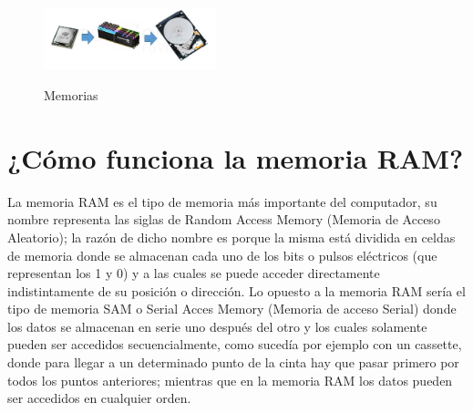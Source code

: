\documentclass{article}
\begin{document}
 
\begin{figure}[h]
\includegraphics[width=5cm]{memorias.jpg}
 \cite{Red}
\centering
\caption{Memorias}
\label{fig:c}
\end{figure}

\section{¿Cómo funciona la memoria RAM?}\label{contenido} 
La memoria RAM es el tipo de memoria más importante del computador, su nombre representa
las siglas de Random Access Memory (Memoria de Acceso Aleatorio); la razón de dicho nombre
es porque la misma está dividida en celdas de memoria donde se almacenan cada uno de los
bits o pulsos eléctricos (que representan los 1 y 0) y a las cuales se puede acceder directamente
indistintamente de su posición o dirección. Lo opuesto a la memoria RAM sería el tipo de
memoria SAM o Serial Acces Memory (Memoria de acceso Serial) donde los datos se almacenan
en serie uno después del otro y los cuales solamente pueden ser accedidos secuencialmente,
como sucedía por ejemplo con un cassette, donde para llegar a un determinado punto de la cinta
hay que pasar primero por todos los puntos anteriores; mientras que en la memoria RAM los
datos pueden ser accedidos en cualquier orden.
\end{document}
